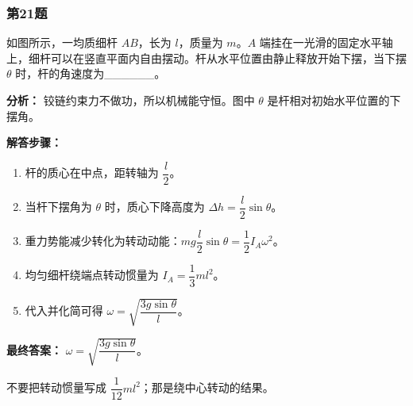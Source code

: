 \documentclass[12pt,a4paper]{ctexart}
\begin{document}
\subsubsection*{第21题}
\begin{tcolorbox}[colback=gray!2!white,colframe=black!60,title={题目}]
如图所示，一均质细杆 \(AB\)，长为 \(l\)，质量为 \(m\)。\(A\) 端挂在一光滑的固定水平轴上，细杆可以在竖直平面内自由摆动。杆从水平位置由静止释放开始下摆，当下摆 \(\theta\) 时，杆的角速度为\_\_\_\_\_\_。\par
\end{tcolorbox}
\begin{tcolorbox}[colback=blue!2!white,colframe=blue!55!black,title={完整答案}]
\textbf{分析：}
铰链约束力不做功，所以机械能守恒。图中 \(\theta\) 是杆相对初始水平位置的下摆角。\par
\textbf{解答步骤：}
\begin{enumerate}
\item 杆的质心在中点，距转轴为 \(\dfrac{l}{2}\)。
\item 当杆下摆角为 \(\theta\) 时，质心下降高度为 \(\Delta h=\dfrac{l}{2}\sin\theta\)。
\item 重力势能减少转化为转动动能：\(mg\dfrac{l}{2}\sin\theta=\dfrac12 I_A\omega^2\)。
\item 均匀细杆绕端点转动惯量为 \(I_A=\dfrac13 ml^2\)。
\item 代入并化简可得 \(\omega=\sqrt{\dfrac{3g\sin\theta}{l}}\)。
\end{enumerate}
\textbf{最终答案：}
\(\omega=\sqrt{\dfrac{3g\sin\theta}{l}}\)。\par
\end{tcolorbox}
\begin{tcolorbox}[colback=red!2!white,colframe=red!55!black,title={易错点}]
不要把转动惯量写成 \(\dfrac{1}{12}ml^2\)；那是绕中心转动的结果。\par
\end{tcolorbox}
\end{document}
